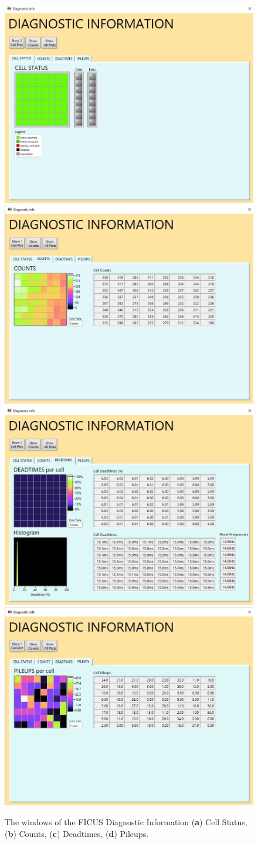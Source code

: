 \documentclass[a4paper,12pt,oneside,pdflatex,italian,final,twocolumn]{article}
\begin{document}
\begin{figure}[h]
\centering
\subfloat
{\includegraphics[width=.48\textwidth]{Capture53.jpg}} \quad
\subfloat
{\includegraphics[width=.48\textwidth]{Capture52.jpg}} \\
\subfloat
{\includegraphics[width=.48\textwidth]{Capture51.jpg}} \quad
\subfloat
{\includegraphics[width=.48\textwidth]{Capture50.jpg}} \\
\caption{The windows of the FICUS Diagnostic Information (\textbf{a}) Cell Status, (\textbf{b}) Counts, (\textbf{c}) Deadtimes, (\textbf{d}) Pileups.}\label{fig:fig45}
\end{figure}
\end{document}
